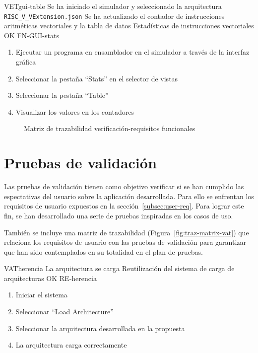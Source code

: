 \begin{testCase}{VET}{gui-table}
    {Se ha iniciado el simulador y seleccionado la arquitectura \texttt{RISC\_V\_VExtension.json}}
    {Se ha actualizado el contador de instrucciones aritméticas vectoriales y la tabla de datos}
    {Estadísticas de instrucciones vectoriales} %
    {OK} %
    {FN-GUI-stats}
    \begin{enumerate}
        \item Ejecutar un programa en ensamblador en el simulador a través de la interfaz gráfica
        \item Seleccionar la pestaña ``Stats'' en el selector de vistas
        \item Seleccionar la pestaña ``Table''
        \item Visualizar los valores en los contadores
    \end{enumerate}
\end{testCase}

{\FloatBarrier}
\begin{figure}
    {}
    \caption{Matriz de trazabilidad verificación-requisitos funcionales}\label{fig:traz-matrix-vet}
\end{figure}

{\FloatBarrier}
\section{Pruebas de validación}\label{sec:validation}

Las pruebas de validación tienen como objetivo verificar si se han cumplido las espectativas del usuario sobre la aplicación desarrollada. Para ello se enfrentan los requisitos de usuario expuestos en la sección~\ref{subsec:user-req}. Para lograr este fin, se han desarrollado una serie de pruebas inspiradas en los casos de uso. 

También se incluye una matriz de trazabilidad (Figura~\ref{fig:traz-matrix-vat}) que relaciona los requisitos de usuario con las pruebas de validación para garantizar que han sido contemplados en su totalidad en el plan de pruebas.

\begin{testCase}{VAT}{herencia}
    {\NA}
    {La arquitectura se carga}
    {Reutilización del sistema de carga de arquitecturas}
    {OK} %
    {RE-herencia}
    \begin{enumerate}
        \item Iniciar el sistema
        \item Seleccionar ``Load Architecture''
        \item Seleccionar la arquitectura desarrollada en la propuesta
        \item La arquitectura carga correctamente
    \end{enumerate}
\end{testCase}

